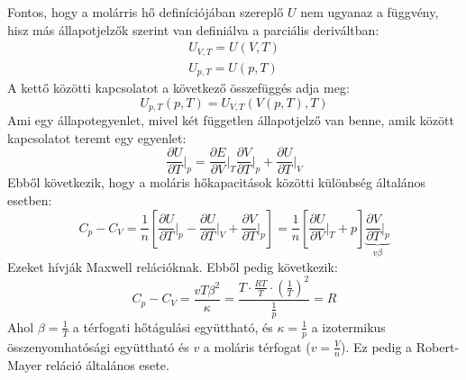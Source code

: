 \documentclass[../main.tex]{subfiles}
\begin{document}
Fontos, hogy a molárris hő definíciójában szereplő $U$ nem ugyanaz a függvény, hisz más állapotjelzők szerint van definiálva a parciális deriváltban:
\begin{equation}
    \begin{aligned}
        U_{V, T} = U(V, T) \\
        U_{p, T} = U(p, T)
    \end{aligned}
\end{equation}
A kettő közötti kapcsolatot a következő összefüggés adja meg:
\begin{equation}
U_{p, T} (p, T)= U_{V, T} (V(p, T), T)
\end{equation}
Ami egy állapotegyenlet, mivel két független állapotjelző van benne, amik között kapcsolatot teremt egy egyenlet:
\begin{equation}
    \frac{\partial U}{\partial T}\bigg|_{p} = \frac{\partial E}{\partial V}\bigg|_{T} \frac{\partial V}{\partial T}\bigg|_{p} + \frac{\partial U}{\partial T}\bigg|_{V}
\end{equation} 
Ebből következik, hogy a moláris hőkapacitások közötti különbség általános esetben:
\begin{equation}
    C_p - C_V = \frac{1}{n} \left[\frac{\partial U}{\partial T}\bigg|_{p} - \frac{\partial U}{\partial T}\bigg|_{V} + \frac{\partial V}{\partial T}\bigg|_{p}\right] = \frac{1}{n} \left[\frac{\partial U}{\partial V}\bigg|_{T} + p \right] \underbrace{\frac{\partial V}{\partial T}\bigg|_{p}}_{v \beta}
\end{equation}
Ezeket hívják Maxwell relációknak. Ebből pedig következik:
\begin{equation}
    C_p - C_V = \frac{v T \beta^2}{\kappa} = \frac{T \cdot \frac{RT}{T} \cdot (\frac{1}{T})^2}{\frac{1}{p}} = R
\end{equation}
Ahol $\beta = \frac{1}{T}$ a térfogati hőtágulási együttható, és $\kappa = \frac{1}{p}$ a izotermikus összenyomhatósági együttható és $v$ a moláris térfogat ($v = \frac{V}{n}$).
Ez pedig a Robert-Mayer reláció általános esete.
\end{document}
